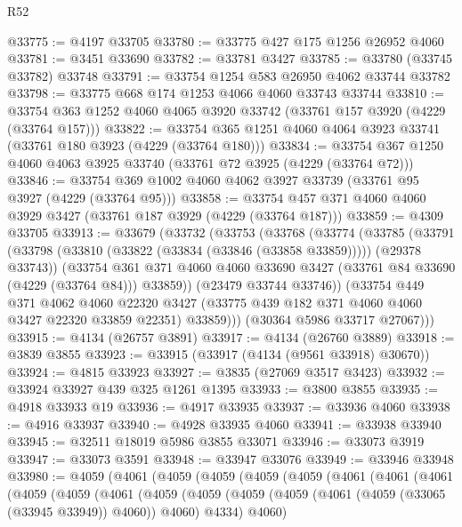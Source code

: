 \begin{lexlean}{R52}
\begin{coremodule}
@33775 := @4197 @33705
@33780 := @33775 @427 @175 @1256 @26952 @4060
@33781 := @3451 @33690
@33782 := @33781 @3427
@33785 := @33780 (@33745 @33782) @33748
@33791 := @33754 @1254 @583 @26950 @4062 @33744 @33782
@33798 := @33775 @668 @174 @1253 @4066 @4060 @33743 @33744
@33810 := @33754 @363 @1252 @4060 @4065 @3920 @33742 (@33761 @157 @3920 (@4229 (@33764 @157)))
@33822 := @33754 @365 @1251 @4060 @4064 @3923 @33741 (@33761 @180 @3923 (@4229 (@33764 @180)))
@33834 := @33754 @367 @1250 @4060 @4063 @3925 @33740 (@33761 @72 @3925 (@4229 (@33764 @72)))
@33846 := @33754 @369 @1002 @4060 @4062 @3927 @33739 (@33761 @95 @3927 (@4229 (@33764 @95)))
@33858 := @33754 @457 @371 @4060 @4060 @3929 @3427 (@33761 @187 @3929 (@4229 (@33764 @187)))
@33859 := @4309 @33705
@33913 := @33679
    (@33732
      (@33753
        (@33768
          (@33774
            (@33785
              (@33791
                (@33798 (@33810 (@33822 (@33834 (@33846 (@33858 @33859))))) (@29378 @33743))
                (@33754
                  @361
                  @371
                  @4060
                  @4060
                  @33690
                  @3427
                  (@33761 @84 @33690 (@4229 (@33764 @84)))
                  @33859))
              (@23479 @33744 @33746))
            (@33754
              @449
              @371
              @4062
              @4060
              @22320
              @3427
              (@33775 @439 @182 @371 @4060 @4060 @3427 @22320 @33859 @22351)
              @33859)))
        (@30364 @5986 @33717 @27067)))
@33915 := @4134 (@26757 @3891)
@33917 := @4134 (@26760 @3889)
@33918 := @3839 @3855
@33923 := @33915 (@33917 (@4134 (@9561 @33918) @30670))
@33924 := @4815 @33923
@33927 := @3835 (@27069 @3517 @3423)
@33932 := @33924 @33927 @439 @325 @1261 @1395
@33933 := @3800 @3855
@33935 := @4918 @33933 @19
@33936 := @4917 @33935
@33937 := @33936 @4060
@33938 := @4916 @33937
@33940 := @4928 @33935 @4060
@33941 := @33938 @33940
@33945 := @32511 @18019 @5986 @3855 @33071
@33946 := @33073 @3919
@33947 := @33073 @3591
@33948 := @33947 @33076
@33949 := @33946 @33948
@33980 := @4059
    (@4061
      (@4059
        (@4059
          (@4059
            (@4059
              (@4061
                (@4061
                  (@4061
                    (@4059
                      (@4059
                        (@4061
                          (@4059
                            (@4059
                              (@4059
                                (@4059 (@4061 (@4059 (@33065 (@33945 @33949)) @4060)) @4060)
                                @4334)
                              @4060)

\end{coremodule}
\end{lexlean}
